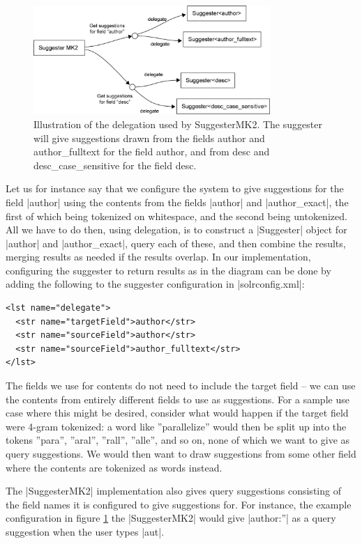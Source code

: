 \begin{figure}[h!]
    \centering
    \includegraphics[width=0.8\textwidth]{img/delegation.png}
    \caption{Illustration of the delegation used by SuggesterMK2. The suggester will give suggestions drawn from the fields author and author\_fulltext for the field author, and from desc and desc\_case\_sensitive for the field desc.}
    \label{fig:delegation}
\end{figure}

Let us for instance say that we configure the system to give suggestions for the field |author| using the contents from the fields |author| and |author_exact|, the first of which being tokenized on whitespace, and the second being untokenized. All we have to do then, using delegation, is to construct a |Suggester| object for |author| and |author_exact|, query each of these, and then combine the results, merging results as needed if the results overlap. In our implementation, configuring the suggester to return results as in the diagram can be done by adding the following to the suggester configuration in |solrconfig.xml|:

\begin{verbatim}
<lst name="delegate">
  <str name="targetField">author</str>
  <str name="sourceField">author</str>
  <str name="sourceField">author_fulltext</str>
</lst>
\end{verbatim}

The fields we use for contents do not need to include the target field – we can use the contents from entirely different fields to use as suggestions. For a sample use case where this might be desired, consider what would happen if the target field were 4-gram tokenized: a word like ''parallelize'' would then be split up into the tokens ''para'', ''aral'', ''rall'', ''alle'', and so on, none of which we want to give as query suggestions. We would then want to draw suggestions from some other field where the contents are tokenized as words instead.

The |SuggesterMK2| implementation also gives query suggestions consisting of the field names it is configured to give suggestions for. For instance, the example configuration in figure \ref{fig:delegation} the |SuggesterMK2| would give |author:”| as a query suggestion when the user types |aut|.

